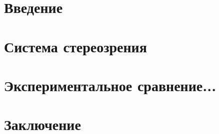 \documentclass[a4paper,14pt]{extarticle} %
\begin{document}



\tableofcontents %
\clearpage

\section{Введение}





\section{Система стереозрения}

\section{Экспериментальное сравнение...}


\section{Заключение}




\end{document}

